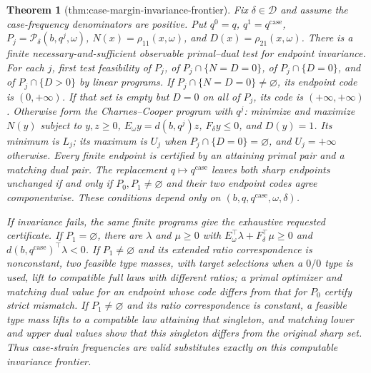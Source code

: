 \documentclass{article}
\newtheorem{theorem}{Theorem}
\begin{document}
\begin{theorem}[thm:case-margin-invariance-frontier]\label{thm:case-margin-invariance-frontier}
Fix \(\delta\in\mathcal D\) and assume the case-frequency denominators are positive.  Put \(q^0=q\), \(q^1=q^{\mathrm{case}}\), \(P_j=\mathcal P_\delta(b,q^j,\omega)\), \(N(x)=\rho_{11}(x,\omega)\), and \(D(x)=\rho_{21}(x,\omega)\).  There is a finite necessary-and-sufficient observable primal--dual test for endpoint invariance.  For each \(j\), first test feasibility of \(P_j\), of \(P_j\cap\{N=D=0\}\), of \(P_j\cap\{D=0\}\), and of \(P_j\cap\{D>0\}\) by linear programs.  If \(P_j\cap\{N=D=0\}\ne\varnothing\), its endpoint code is \((0,+\infty)\).  If that set is empty but \(D=0\) on all of \(P_j\), its code is \((+\infty,+\infty)\).  Otherwise form the Charnes--Cooper program with \(q^j\): minimize and maximize \(N(y)\) subject to \(y,z\geq0\), \(E_\omega y=d(b,q^j)z\), \(F_\delta y\leq0\), and \(D(y)=1\).  Its minimum is \(L_j\); its maximum is \(U_j\) when \(P_j\cap\{D=0\}=\varnothing\), and \(U_j=+\infty\) otherwise.  Every finite endpoint is certified by an attaining primal pair and a matching dual pair.  The replacement \(q\mapsto q^{\mathrm{case}}\) leaves both sharp endpoints unchanged if and only if \(P_0,P_1\ne\varnothing\) and their two endpoint codes agree componentwise.  These conditions depend only on \((b,q,q^{\mathrm{case}},\omega,\delta)\).

If invariance fails, the same finite programs give the exhaustive requested certificate.  If \(P_1=\varnothing\), there are \(\lambda\) and \(\mu\geq0\) with \(E_\omega^\top\lambda+F_\delta^\top\mu\geq0\) and \(d(b,q^{\mathrm{case}})^\top\lambda<0\).  If \(P_1\ne\varnothing\) and its extended ratio correspondence is nonconstant, two feasible type masses, with target selections when a \(0/0\) type is used, lift to compatible full laws with different ratios; a primal optimizer and matching dual value for an endpoint whose code differs from that for \(P_0\) certify strict mismatch.  If \(P_1\ne\varnothing\) and its ratio correspondence is constant, a feasible type mass lifts to a compatible law attaining that singleton, and matching lower and upper dual values show that this singleton differs from the original sharp set.  Thus case-strain frequencies are valid substitutes exactly on this computable invariance frontier.
\end{theorem}
\end{document}

